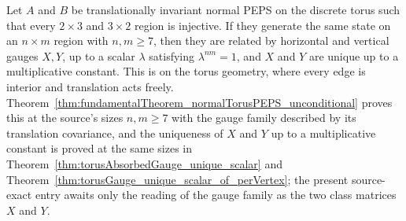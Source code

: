 \begin{theorem}%
    \label{thm:fundamentalTheorem_normalTorusPEPS}
    \notready
    Let $A$ and $B$ be translationally invariant normal PEPS on the discrete
    torus such that every $2\times 3$ and $3\times 2$ region is injective. If
    they generate the same state on an $n\times m$ region with $n,m\geq 7$, then
    they are related by horizontal and vertical gauges $X,Y$, up to a scalar
    $\lambda$ satisfying $\lambda^{nm}=1$, and $X$ and $Y$ are unique up to a
    multiplicative constant. This is
    \cite[Theorem~3]{Molnar2018NormalPEPS} on the torus geometry, where every
    edge is interior and translation acts freely.
    Theorem~\ref{thm:fundamentalTheorem_normalTorusPEPS_unconditional} proves
    this at the source's sizes $n,m\geq 7$ with the gauge family described
    by its translation covariance, and the uniqueness of $X$ and $Y$ up to a
    multiplicative constant is proved at the same sizes in
    Theorem~\ref{thm:torusAbsorbedGauge_unique_scalar} and
    Theorem~\ref{thm:torusGauge_unique_scalar_of_perVertex}; the present
    source-exact entry awaits only the reading of the gauge family as the two
    class matrices $X$ and $Y$.
\end{theorem}

